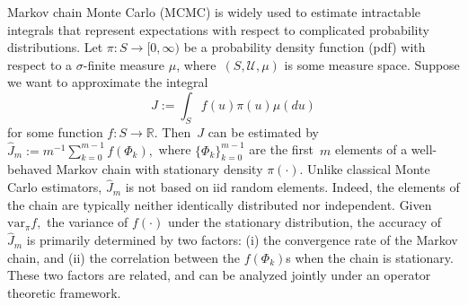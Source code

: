 \documentclass[11pt]{article}
\begin{document}
	Markov chain Monte Carlo (MCMC) is widely used to estimate
        intractable integrals that represent expectations with respect
        to complicated probability distributions.  Let $\pi: S \to
        [0,\infty)$ be a probability density function (pdf) with
        respect to a $\sigma$-finite measure $\mu$,
        where~$(S,\mathcal{U},\mu)$ is some measure space.  Suppose we
        want to approximate the integral
	\[
	J := \int_S f(u) \pi(u) \mu(du)
	\]
	for some function $f: S \to \mathbb{R}$.  Then~$J$ can be
        estimated by $\hat{J}_m := m^{-1} \sum_{k=0}^{m-1} f(\Phi_k),$
        where $\{\Phi_k\}_{k=0}^{m-1}$ are the first~$m$ elements of a
        well-behaved Markov chain with stationary density $\pi(\cdot)$.
        Unlike classical Monte Carlo estimators, $\hat{J}_m$ is not
        based on iid random elements.  Indeed, the elements of the
        chain are typically neither identically distributed nor
        independent.  Given $\mathrm{var}_{\pi}f,$ the variance of
        $f(\cdot)$ under the stationary distribution, the accuracy of
        $\hat{J}_m$ is primarily determined by two factors: (i) the
        convergence rate of the Markov chain, and (ii) the correlation
        between the $f(\Phi_k)$s when the chain is stationary. These
        two factors are related, and can be analyzed jointly under an
        operator theoretic framework.
	
\end{document}
